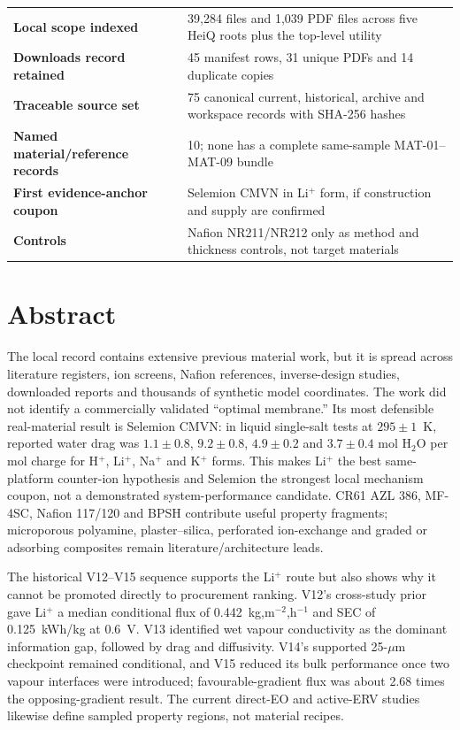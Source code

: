 \documentclass[10pt,a4paper]{article}
\begin{document}
\vfill
\begin{tabularx}{\textwidth}{@{}p{46mm}Y@{}}
\textbf{Local scope indexed} & 39,284 files and 1,039 PDF files across five HeiQ roots plus the top-level utility \\
\textbf{Downloads record retained} & 45 manifest rows, 31 unique PDFs and 14 duplicate copies \\
\textbf{Traceable source set} & 75 canonical current, historical, archive and workspace records with SHA-256 hashes \\
\textbf{Named material/reference records} & 10; none has a complete same-sample MAT-01--MAT-09 bundle \\
\textbf{First evidence-anchor coupon} & Selemion CMVN in Li$^+$ form, if construction and supply are confirmed \\
\textbf{Controls} & Nafion NR211/NR212 only as method and thickness controls, not target materials
\end{tabularx}

\clearpage

\section*{Abstract}

The local record contains extensive previous material work, but it is spread
across literature registers, ion screens, Nafion references, inverse-design
studies, downloaded reports and thousands of synthetic model coordinates. The
work did not identify a commercially validated ``optimal membrane.'' Its most
defensible real-material result is Selemion CMVN: in liquid single-salt tests
at $295\pm1$~K, reported water drag was
$1.1\pm0.8$, $9.2\pm0.8$, $4.9\pm0.2$ and $3.7\pm0.4$ mol H$_2$O per mol
charge for H$^+$, Li$^+$, Na$^+$ and K$^+$ forms. This makes Li$^+$ the best
same-platform counter-ion hypothesis and Selemion the strongest local
mechanism coupon, not a demonstrated system-performance candidate. CR61 AZL
386, MF-4SC, Nafion 117/120 and BPSH contribute useful property fragments;
microporous polyamine, plaster--silica, perforated ion-exchange and graded or
adsorbing composites remain literature/architecture leads.

The historical V12--V15 sequence supports the Li$^+$ route but also shows why
it cannot be promoted directly to procurement ranking. V12's cross-study
prior gave Li$^+$ a median conditional flux of 0.442~kg,m$^{-2}$,h$^{-1}$
and SEC of 0.125~kWh/kg at 0.6~V. V13 identified wet vapour conductivity as
the dominant information gap, followed by drag and diffusivity. V14's
supported 25-$\mu$m checkpoint remained conditional, and V15 reduced its bulk
performance once two vapour interfaces were introduced; favourable-gradient
flux was about 2.68 times the opposing-gradient result. The current direct-EO
and active-ERV studies likewise define sampled property regions, not material
recipes.
\end{document}
